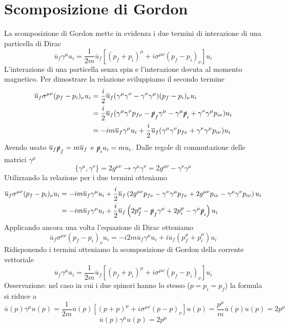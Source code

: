 \section{Scomposizione di Gordon}
La scomposizione di Gordon mette in evidenza i due termini di interazione di una particella di Dirac
$$
\overline{u}_f \gamma^\mu u_i = \frac{1}{2m} \overline{u}_f \left[ (p_f + p_i)^\mu + i \sigma^{\mu\nu} (p_f - p_i)_\nu \right] u_i
$$
L'interazione di una particella senza spin e l'interazione dovuta al momento magnetico. Per dimostrare la relazione sviluppiamo il secondo termine
$$
\begin{aligned}
	\overline{u}_f \sigma^{\mu\nu} (p_f - p_i)_\nu u_i &= \frac{i}{2} \overline{u}_f (\gamma^\mu \gamma^\nu - \gamma^\nu \gamma^\mu) (p_f - p_i)_\nu u_i \\
	&= \frac{i}{2} \overline{u}_f (\gamma^\mu \gamma^\nu p_{f\nu} - \slashed{p}_f \gamma^\mu - \gamma^\mu \slashed{p}_i + \gamma^\nu \gamma^\mu p_{i\nu}) u_i \\
	&= -im \overline{u}_f \gamma^\mu u_i + \frac{i}{2} \overline{u}_f (\gamma^\mu \gamma^\nu p_{f\nu} + \gamma^\nu \gamma^\mu p_{i\nu}) u_i
\end{aligned}
$$
Avendo usato $\overline{u}_f \slashed{p}_f = m \overline{u}_f$ e $\slashed{p}_i u_i = m u_i$. Dalle regole di commutazione delle matrici $\gamma^\mu$
$$
\{ \gamma^\mu, \gamma^\nu \} = 2g^{\mu\nu} \to \gamma^\mu \gamma^\nu = 2g^{\mu\nu} - \gamma^\nu \gamma^\mu
$$
Utilizzando la relazione per i due termini otteniamo
$$
\begin{aligned}
	\overline{u}_f \sigma^{\mu\nu} (p_f - p_i)_\nu u_i &= -im \overline{u}_f \gamma^\mu u_i + \frac{i}{2} \overline{u}_f \left( 2g^{\mu\nu} p_{f\nu} - \gamma^\nu \gamma^\mu p_{f\nu} + 2g^{\mu\nu} p_{i\nu} - \gamma^\mu \gamma^\nu p_{i\nu} \right) u_i \\
	&= -im \overline{u}_f \gamma^\mu u_i + \frac{i}{2} \overline{u}_f \left( 2p_f^\mu - \slashed{p}_f \gamma^\mu + 2p_i^\mu - \gamma^\mu \slashed{p}_i \right) u_i
\end{aligned}
$$
Applicando ancora una volta l'equazione di Dirac otteniamo
$$
\overline{u}_f \sigma^{\mu\nu} (p_f - p_i)_\nu u_i = -i2m \overline{u}_f \gamma^\mu u_i + i \overline{u}_f (p_f^\mu + p_i^\mu) u_i
$$
Ridisponendo i termini otteniamo la scomposizione di Gordon della corrente vettoriale
$$
\overline{u}_f \gamma^\mu u_i = \frac{1}{2m} \overline{u}_f \left[ (p_f + p_i)^\mu + i\sigma^{\mu\nu} (p_f - p_i)_\nu \right] u_i
$$
Osservazione: nel caso in cui i due spinori hanno lo stesso ($p=p_i=p_f$) la formula si riduce a
$$
\overline{u}(p) \gamma^\mu u(p) = \frac{1}{2m} \overline{u}(p) \left[ (p + p)^\mu + i\sigma^{\mu\nu} (p - p)_\nu \right] u(p) = \frac{p^\mu}{m} \overline{u}(p) u(p) = 2p^\mu
$$
$$
\overline{u}(p) \gamma^\mu u(p) = 2p^\mu
$$
